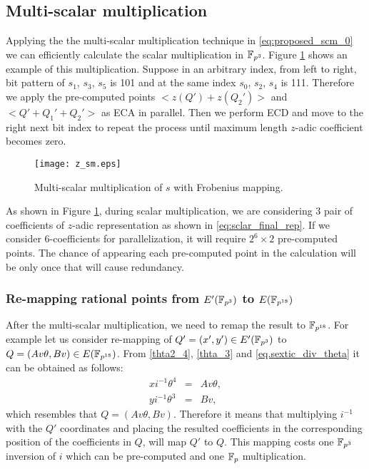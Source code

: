 \subsection{Multi-scalar multiplication}
Applying the the multi-scalar multiplication technique in \eqref{eq:proposed_scm_0} we can efficiently calculate the scalar multiplication in $\mathbb{F}_{p^3}$. Figure \ref{fig:z_sml} shows an example of this multiplication.
Suppose in an arbitrary index, from left to right, bit pattern of $s_1$, $s_3$, $s_5$ is 101 and at the same index $s_0$, $s_2$, $s_4$ is 111.
Therefore we apply the pre-computed points $< z(Q')+z(Q_2') >$ and $<Q'+Q_1'+Q_2'>$ as ECA in parallel.
Then we perform ECD and move to the right next bit index to repeat the process until maximum length $z$-adic coefficient becomes zero.
\begin{figure}[!ht]
\centering
\texttt{[image: z\_sm.eps]}
\caption{Multi-scalar multiplication of $s$ with Frobenius mapping.}
\label{fig:z_sml}
\end{figure}

As shown in Figure \ref{fig:z_sml}, during scalar multiplication, we are considering 3 pair of coefficients of $z$-adic representation as shown in  \eqref{eq:sclar_final_rep}. If we consider 6-coefficients for parallelization, it will require $2^6 \times 2$ pre-computed points. The chance of appearing each pre-computed point in the calculation will be only once that will cause redundancy.  

\subsubsection{Re-mapping rational points from $E'(\mathbb{F}_{p^3})$ to $E(\mathbb{F}_{p^{18}})$}
 After the multi-scalar multiplication, we need to remap the result to $\mathbb{F}_{p^{18}}$. For example let us consider re-mapping of $Q' =(x',y') \in E'(\mathbb{F}_{p^3})$ to $Q =(Av\theta,Bv) \in E(\mathbb{F}_{p^{18}})$. From \eqref{thta2_4}, \eqref{thta_3} and \eqref{eq.sextic_div_theta} it can be obtained as follows:
 \begin{subequations}
 \begin{eqnarray}
 x i^{-1}\theta^{4} & = & Av\theta, \nonumber \\
 y i^{-1}\theta^{3} & = & Bv, \nonumber
 \end{eqnarray}
 \end{subequations}
  which resembles that $Q= (Av\theta, Bv)$. Therefore it means that multiplying $i^{-1}$ with the $Q'$ coordinates and placing the resulted coefficients in the corresponding position of the coefficients in $Q$, will map $Q'$ to $Q$.
This mapping costs one $\mathbb{F}_{p^3}$ inversion of $i$ which can be pre-computed and one ${\mathbb{F}}_{p}$ multiplication.

